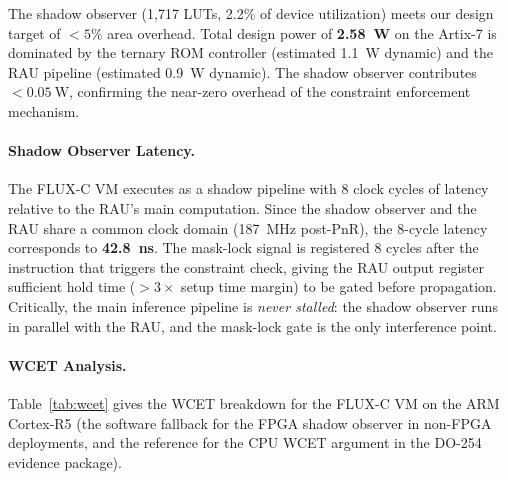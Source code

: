 \documentclass[conference]{IEEEtran}
\begin{document}
The shadow observer (1,717 LUTs, 2.2\% of device utilization) meets our
design target of $< 5\%$ area overhead.
Total design power of \textbf{2.58~W} on the Artix-7 is dominated by the
ternary ROM controller (estimated 1.1~W dynamic) and the RAU pipeline
(estimated 0.9~W dynamic).
The shadow observer contributes $< 0.05~\mathrm{W}$, confirming the
near-zero overhead of the constraint enforcement mechanism.

\paragraph{Shadow Observer Latency.}
The FLUX-C VM executes as a shadow pipeline with 8 clock cycles of latency
relative to the RAU's main computation.
Since the shadow observer and the RAU share a common clock domain
(187~MHz post-PnR), the 8-cycle latency corresponds to \textbf{42.8~ns}.
The mask-lock signal is registered 8 cycles after the instruction that
triggers the constraint check, giving the RAU output register sufficient
hold time ($> 3 \times$ setup time margin) to be gated before propagation.
Critically, the main inference pipeline is \emph{never stalled}: the shadow
observer runs in parallel with the RAU, and the mask-lock gate is the only
interference point.

\paragraph{WCET Analysis.}
Table~\ref{tab:wcet} gives the WCET breakdown for the FLUX-C VM on the
ARM Cortex-R5 (the software fallback for the FPGA shadow observer in
non-FPGA deployments, and the reference for the CPU WCET argument in the
DO-254 evidence package).
\end{document}
